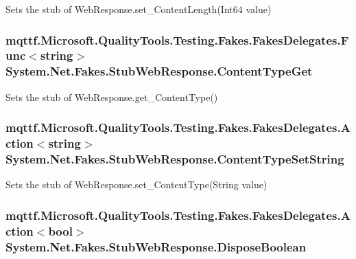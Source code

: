 Sets the stub of Web\-Response.\-set\-\_\-\-Content\-Length(\-Int64 value)

\hypertarget{class_system_1_1_net_1_1_fakes_1_1_stub_web_response_aac87bc4cabb22bbbc1191952e6938fa2}{
\subsubsection[{Content\-Type\-Get}]{\setlength{\rightskip}{0pt plus 5cm}mqttf.\-Microsoft.\-Quality\-Tools.\-Testing.\-Fakes.\-Fakes\-Delegates.\-Func$<$string$>$ System.\-Net.\-Fakes.\-Stub\-Web\-Response.\-Content\-Type\-Get}}\label{class_system_1_1_net_1_1_fakes_1_1_stub_web_response_aac87bc4cabb22bbbc1191952e6938fa2}


Sets the stub of Web\-Response.\-get\-\_\-\-Content\-Type()

\hypertarget{class_system_1_1_net_1_1_fakes_1_1_stub_web_response_a30bd7bb5a62f05a559cf0895e25adf75}{
\subsubsection[{Content\-Type\-Set\-String}]{\setlength{\rightskip}{0pt plus 5cm}mqttf.\-Microsoft.\-Quality\-Tools.\-Testing.\-Fakes.\-Fakes\-Delegates.\-Action$<$string$>$ System.\-Net.\-Fakes.\-Stub\-Web\-Response.\-Content\-Type\-Set\-String}}\label{class_system_1_1_net_1_1_fakes_1_1_stub_web_response_a30bd7bb5a62f05a559cf0895e25adf75}


Sets the stub of Web\-Response.\-set\-\_\-\-Content\-Type(\-String value)

\hypertarget{class_system_1_1_net_1_1_fakes_1_1_stub_web_response_aeb26869c6ec183bc4ec3930c14c6b4aa}{
\subsubsection[{Dispose\-Boolean}]{\setlength{\rightskip}{0pt plus 5cm}mqttf.\-Microsoft.\-Quality\-Tools.\-Testing.\-Fakes.\-Fakes\-Delegates.\-Action$<$bool$>$ System.\-Net.\-Fakes.\-Stub\-Web\-Response.\-Dispose\-Boolean}}\label{class_system_1_1_net_1_1_fakes_1_1_stub_web_response_aeb26869c6ec183bc4ec3930c14c6b4aa}


